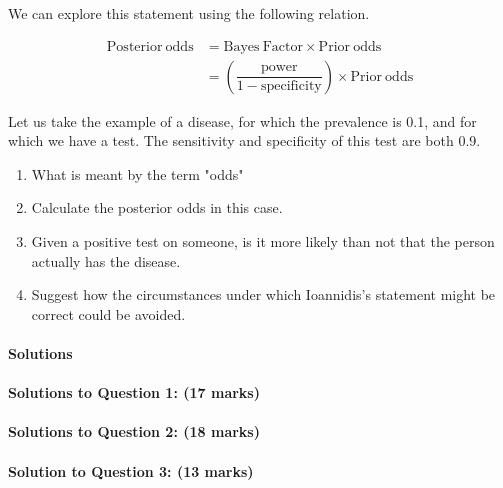 \documentclass[a4paper,12pt,fleqn]{article}
\begin{document}
We can explore this statement using the following relation. 

\begin{align}
\mathrm{Posterior\ odds} &= \mathrm{Bayes\ Factor}\times\mathrm{Prior\ odds}\\
&=\left(\dfrac{\mathrm{power}}{\mathrm{1-specificity}}\right)\times\mathrm{Prior\ odds}
\end{align}

Let us take the example of a disease, for which the prevalence is 0.1, and for which we have a test. The sensitivity and specificity of this test are both 0.9. 

\begin{enumerate}
\item What is meant by the term "odds"
\item Calculate the posterior odds in this case.
\item Given a positive test on someone, is it more likely than not that the person actually has the disease.
\item Suggest  how the circumstances under which Ioannidis's statement might be correct could be avoided.

\end{enumerate}





\newpage
\paragraph{\textbf{Solutions} \ }

\paragraph{\textbf{Solutions to Question 1: (17 marks)}}



\paragraph{\textbf{Solutions to Question 2: (18 marks)}}


\paragraph{\textbf{Solution to Question 3: (13 marks)}}
\end{document}
